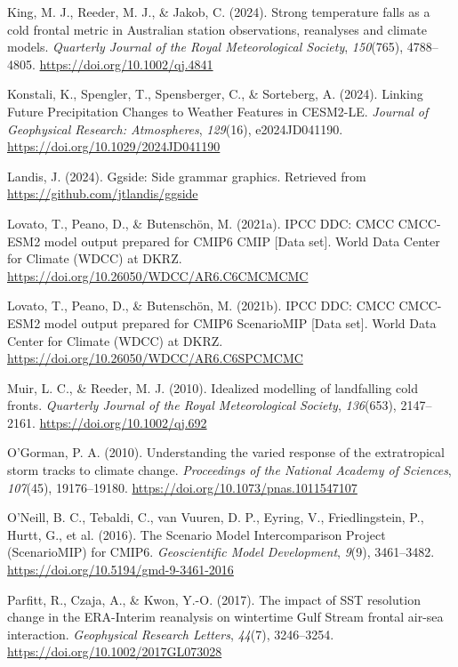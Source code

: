 \documentclass[
]{agujournal2019}
\newlength{\cslhangindent}
\newenvironment{CSLReferences}[2] %
 {\begin{list}{}{%
  \setlength{\itemindent}{0pt}
  \setlength{\leftmargin}{0pt}
  \setlength{\parsep}{0pt}
  \ifodd #1
   \setlength{\leftmargin}{\cslhangindent}
   \setlength{\itemindent}{-1\cslhangindent}
  \fi
  \setlength{\itemsep}{#2\baselineskip}}}
 {\end{list}}
\begin{document}
\begin{CSLReferences}{1}{0}
King, M. J., Reeder, M. J., \& Jakob, C. (2024). Strong temperature
falls as a cold frontal metric in {Australian} station observations,
reanalyses and climate models. \emph{Quarterly Journal of the Royal
Meteorological Society}, \emph{150}(765), 4788--4805.
\url{https://doi.org/10.1002/qj.4841}

Konstali, K., Spengler, T., Spensberger, C., \& Sorteberg, A. (2024).
Linking {Future Precipitation Changes} to {Weather Features} in
{CESM2-LE}. \emph{Journal of Geophysical Research: Atmospheres},
\emph{129}(16), e2024JD041190.
\url{https://doi.org/10.1029/2024JD041190}

Landis, J. (2024). Ggside: Side grammar graphics. Retrieved from
\url{https://github.com/jtlandis/ggside}

Lovato, T., Peano, D., \& Butenschön, M. (2021a). {IPCC DDC}: {CMCC
CMCC-ESM2} model output prepared for {CMIP6 CMIP} {[}Data set{]}. World
Data Center for Climate (WDCC) at DKRZ.
\url{https://doi.org/10.26050/WDCC/AR6.C6CMCMCMC}

Lovato, T., Peano, D., \& Butenschön, M. (2021b). {IPCC DDC}: {CMCC
CMCC-ESM2} model output prepared for {CMIP6 ScenarioMIP} {[}Data set{]}.
World Data Center for Climate (WDCC) at DKRZ.
\url{https://doi.org/10.26050/WDCC/AR6.C6SPCMCMC}

Muir, L. C., \& Reeder, M. J. (2010). Idealized modelling of landfalling
cold fronts. \emph{Quarterly Journal of the Royal Meteorological
Society}, \emph{136}(653), 2147--2161.
\url{https://doi.org/10.1002/qj.692}

O'Gorman, P. A. (2010). Understanding the varied response of the
extratropical storm tracks to climate change. \emph{Proceedings of the
National Academy of Sciences}, \emph{107}(45), 19176--19180.
\url{https://doi.org/10.1073/pnas.1011547107}

O'Neill, B. C., Tebaldi, C., van Vuuren, D. P., Eyring, V.,
Friedlingstein, P., Hurtt, G., et al. (2016). The {Scenario Model
Intercomparison Project} ({ScenarioMIP}) for {CMIP6}.
\emph{Geoscientific Model Development}, \emph{9}(9), 3461--3482.
\url{https://doi.org/10.5194/gmd-9-3461-2016}

Parfitt, R., Czaja, A., \& Kwon, Y.-O. (2017). The impact of {SST}
resolution change in the {ERA-Interim} reanalysis on wintertime {Gulf
Stream} frontal air-sea interaction. \emph{Geophysical Research
Letters}, \emph{44}(7), 3246--3254.
\url{https://doi.org/10.1002/2017GL073028}


\end{CSLReferences}
\end{document}
